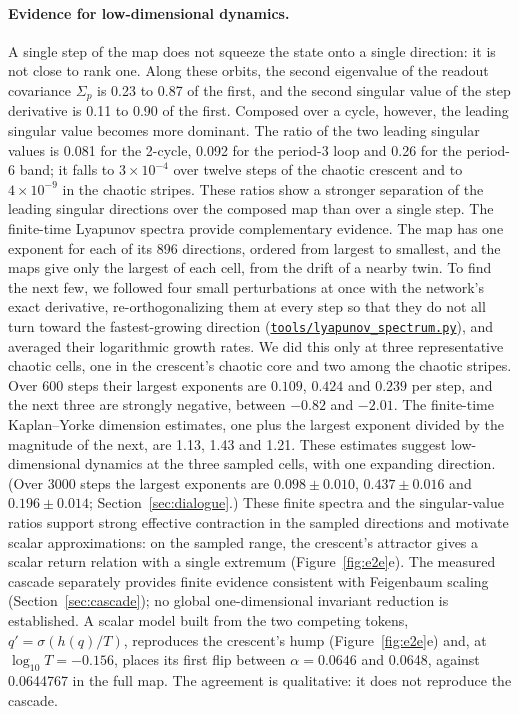 \documentclass[11pt,letterpaper]{article}
\newcommand{\repourl}{https://github.com/tdj28/neural-shrimp}
\newcommand{\reporef}{arxiv-v1}
\newcommand{\repo}[1]{\href{\repourl/blob/\reporef/#1}{\nolinkurl{#1}}}
\begin{document}
\paragraph{Evidence for low-dimensional dynamics.} A single step of the map does not squeeze the state onto a single direction: it is not close to rank one. Along these orbits, the second
eigenvalue of the readout covariance $\Sigma_p$ is 0.23 to 0.87 of the first, and the second singular value of the
step derivative is 0.11 to 0.90 of the first. Composed over a cycle, however, the leading singular value becomes more dominant. The
ratio of the two leading singular values is 0.081 for the 2-cycle, 0.092 for the period-3 loop and 0.26 for the
period-6 band; it falls to $3\times10^{-4}$ over twelve steps of the chaotic crescent and to $4\times10^{-9}$ in the
chaotic stripes. These ratios show a stronger separation of the leading singular directions over the composed map than over a
single step. The finite-time Lyapunov spectra provide complementary evidence. The map has one exponent for each of its 896 directions, ordered from largest to smallest, and the maps give only
the largest of each cell, from the drift of a nearby twin. To find the next few, we followed four small perturbations
at once with the network's exact derivative, re-orthogonalizing them at every step so that they do not all turn
toward the fastest-growing direction (\repo{tools/lyapunov_spectrum.py}), and averaged their logarithmic growth
rates. We did this only at three representative chaotic cells, one in the crescent's chaotic core
and two among the chaotic stripes. Over 600 steps their largest exponents are $0.109$, $0.424$ and $0.239$ per step,
and the next three are strongly negative, between $-0.82$ and $-2.01$. The finite-time Kaplan--Yorke dimension estimates,
one plus the largest exponent divided by the magnitude of
the next, are 1.13, 1.43 and 1.21. These estimates suggest low-dimensional dynamics at the three sampled cells,
with one expanding direction. (Over 3000 steps the largest exponents are
$0.098\pm0.010$, $0.437\pm0.016$ and $0.196\pm0.014$; Section~\ref{sec:dialogue}.) These
finite spectra and the singular-value ratios support strong effective contraction in the sampled directions and
motivate scalar approximations: on the sampled range, the crescent's attractor gives a scalar return relation with a
single extremum (Figure~\ref{fig:e2e}e). The measured cascade separately provides finite evidence consistent with
Feigenbaum scaling (Section~\ref{sec:cascade}); no global one-dimensional invariant reduction is established. A scalar model built from the two
competing tokens, $q'=\sigma(h(q)/T)$, reproduces the crescent's hump (Figure~\ref{fig:e2e}e) and, at $\log_{10}T=-0.156$, places its first flip
between $\alpha=0.0646$ and 0.0648, against 0.0644767 in the full map. The agreement is qualitative:
it does not reproduce the cascade.
\end{document}
